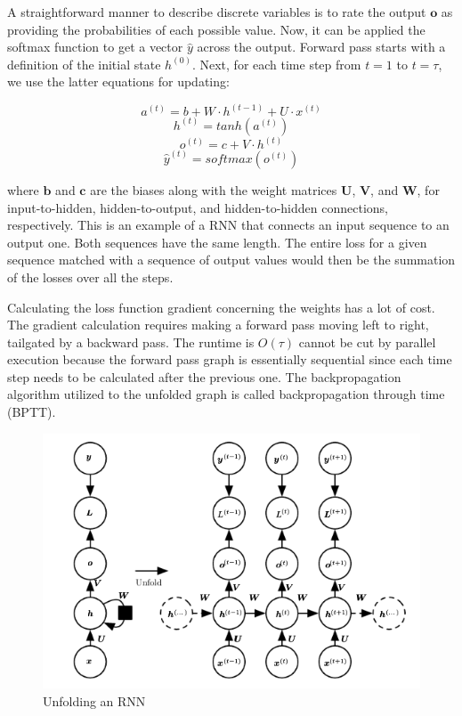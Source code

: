 A straightforward manner to describe discrete variables is to rate the output $\textbf{o}$ as providing the probabilities of each possible value.
Now, it can be applied the softmax function to get a vector $\hat{y}$ across the output.
Forward pass starts with a definition of the initial state $h^{(0)}$.
Next, for each time step from $t=1$ to $t=\tau$, we use the latter equations for updating:

\begin{equation}
    a^{(t)} = b + W \cdot h^{(t-1)} + U \cdot x^{(t)}\label{eq:equation6}
\end{equation}
\begin{equation}
    h^{(t)} = tanh(a^{(t)})\label{eq:equation7}
\end{equation}
\begin{equation}
    o^{(t)} = c + V \cdot h^{(t)}\label{eq:equation9}
\end{equation}
\begin{equation}
    \hat{y}^{(t)} = softmax(o^{(t)})\label{eq:equation8}
\end{equation}

where $\textbf{b}$ and $\textbf{c}$ are the biases along with the weight matrices $\textbf{U}$,
$\textbf{V}$, and $\textbf{W}$, for input-to-hidden, hidden-to-output, and hidden-to-hidden connections, respectively.
This is an example of a RNN that connects an input sequence to an output one.
Both sequences have the same length.
The entire loss for a given sequence matched with a sequence of output values would
then be the summation of the losses over all the steps.

Calculating the loss function gradient concerning the weights has a lot of cost.
The gradient calculation requires making a forward pass moving left to right, tailgated by a backward pass.
The runtime is $O(\tau)$ cannot be cut by parallel execution because the forward pass graph is essentially
sequential since each time step needs to be calculated after the previous one.
The backpropagation algorithm utilized to the unfolded graph is called backpropagation through time (BPTT).

\begin{figure}[H]
    \centering
    \includegraphics[scale=0.8]{./images/background/rnn_unfolded.png}
    \caption{Unfolding an RNN}
    \label{fig:rnn_unfolded}
\end{figure}

